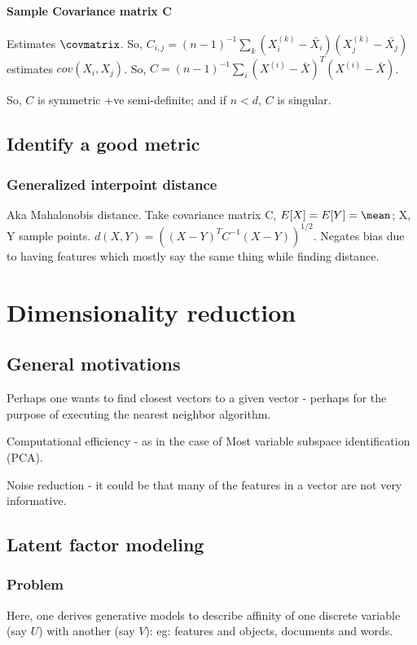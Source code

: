 \documentclass[oneside, article]{memoir}
\begin{document}
\subsubsection{Sample Covariance matrix C}
Estimates $\covmatrix$. So, $C_{i,j} = (n-1)^{-1}\sum_k (X_i^{(k)} - \bar{X_i})(X_j^{(k)} - \bar{X_j})$ estimates $cov(X_i, X_j)$. So, $C = (n-1)^{-1}\sum_i (X^{(i)} - \bar{X})^{T}(X^{(i)} - \bar{X})$.

So, $C$ is symmetric +ve semi-definite; and if $n<d$, $C$ is singular.

\section{Identify a good metric}
\subsection{Generalized interpoint distance}
Aka Mahalonobis distance. Take covariance matrix C, $E[X] = E[Y] = \mean$; X, Y sample points. $d(X, Y) = ((X-Y)^{T}C^{-1}(X-Y))^{1/2}$. Negates bias due to having features which mostly say the same thing while finding distance.

\chapter{Dimensionality reduction}
\section{General motivations}
Perhaps one wants to find closest vectors to a given vector - perhaps for the purpose of executing the nearest neighbor algorithm.

Computational efficiency - as in the case of Most variable subspace identification (PCA).

Noise reduction - it could be that many of the features in a vector are not very informative.

\section{Latent factor modeling}
\subsection{Problem}
Here, one derives generative models to describe  affinity of one discrete variable (say $U$) with another (say $V$): eg: features and objects, documents and words.
\end{document}
